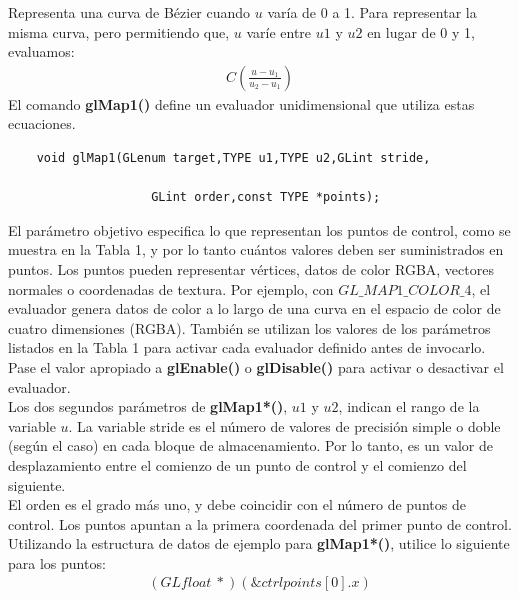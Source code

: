 Representa una curva de Bézier cuando $u$ varía de 0 a 1. Para representar la misma curva, pero permitiendo que, $u$ varíe entre $u1$ y $u2$ en lugar de 0 y 1, evaluamos:
\begin{align*}
C\left(\frac{u-u_1}{u_2-u_1}\right)
\end{align*}
El comando \textbf{glMap1()} define un evaluador unidimensional que utiliza estas ecuaciones.\\

\begin{lstlisting}
    void glMap1(GLenum target,TYPE u1,TYPE u2,GLint stride,

                    GLint order,const TYPE *points);
\end{lstlisting}
El parámetro objetivo especifica lo que representan los puntos de control, como se muestra en la Tabla 1, y por lo tanto cuántos valores deben ser suministrados en puntos. Los puntos pueden representar vértices, datos de color RGBA, vectores normales o coordenadas de textura. Por ejemplo, con \textbf{$GL\_MAP1\_COLOR\_4$}, el evaluador genera datos de color a lo largo de una curva en el espacio de color de cuatro dimensiones (RGBA). También se utilizan los valores de los parámetros listados en la Tabla 1 para activar cada evaluador definido antes de invocarlo. Pase el valor apropiado a \textbf{glEnable()} o \textbf{glDisable()} para activar o desactivar el evaluador.\\

Los dos segundos parámetros de \textbf{glMap1*()}, $u1$ y $u2$, indican el rango de la variable $u$. La variable stride es el número de valores de precisión simple o doble (según el caso) en cada bloque de almacenamiento. Por lo tanto, es un valor de desplazamiento entre el comienzo de un punto de control y el comienzo del siguiente. \\

El orden es el grado más uno, y debe coincidir con el número de puntos de control. Los puntos apuntan a la primera coordenada del primer punto de control. Utilizando la estructura de datos de ejemplo para \textbf{glMap1*()}, utilice lo siguiente para los puntos:
\begin{align*}
(GLfloat \ *) (\&ctrlpoints[0].x)
\end{align*}

